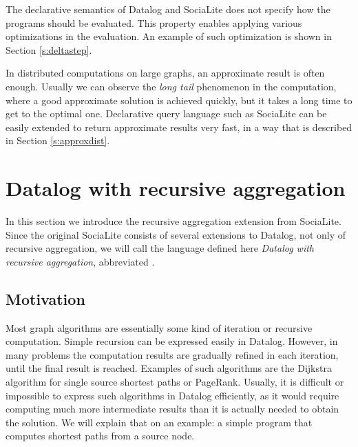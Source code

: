The declarative semantics of Datalog and SociaLite does not specify how the programs should be evaluated. This property enables applying various optimizations in the evaluation. An example of such optimization is shown in Section \ref{s:deltastep}.  


In distributed computations on large graphs, an approximate result is often enough. Usually we can observe the \emph{long tail} phenomenon in the computation, where a good approximate solution is achieved quickly, but it takes a long time to get to the optimal one. Declarative query language such as SociaLite can be easily extended to return approximate results very fast, in a way that is described in Section \ref{s:approxdist}.


\section{Datalog with recursive aggregation}\label{s:recaggr}

In this section we introduce the recursive aggregation extension from SociaLite. Since the original SociaLite consists of several extensions to Datalog, not only of recursive aggregation, we will call the language defined here \emph{Datalog with recursive aggregation}, abbreviated \datalogra.

\subsection{Motivation}
Most graph algorithms are essentially some kind of iteration or recursive computation. Simple recursion can be expressed easily in Datalog. However, in many problems the computation results are gradually refined in each iteration, until the final result is reached. Examples of such algorithms are the Dijkstra algorithm for single source shortest paths or PageRank. Usually, it is difficult or impossible to express such algorithms in Datalog efficiently, as it would require computing much more intermediate results than it is actually needed to obtain the solution. We will explain that on an example: a simple program that computes shortest paths from a source node.

